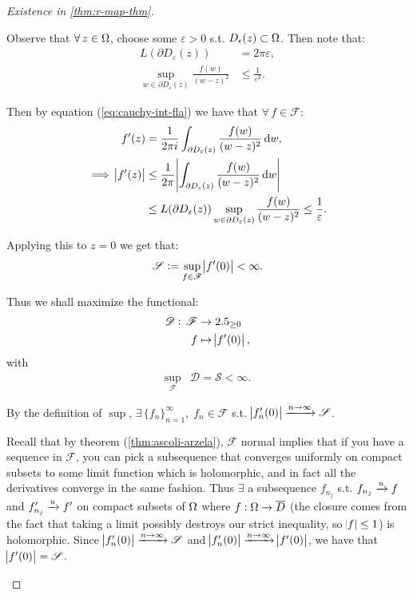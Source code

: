 \begin{proof}[Existence in \ref{thm:r-map-thm}]
\begin{enumerate}
Observe that $\forall \, z \in \Omega$, choose some $\varepsilon > 0$ s.t. $D_\epsilon(z) \subset \Omega$. Then note that:
\begin{align*}
    L(\partial D_\varepsilon (z)) &= 2 \pi \varepsilon,\\
    \sup_{w \in \partial D_\varepsilon (z)} \frac{f(w)}{(w-z)^2} &\leq \frac{1}{\varepsilon^2}.
\end{align*}

Then by equation (\ref{eq:cauchy-int-fla}) we have that $\forall \, f \in \mathscr{F}$:
\begin{align*}
    f'(z) &= \frac{1}{2 \pi i} \int_{\partial D_\varepsilon (z)} \frac{f(w)}{(w-z)^2} \dif w,\\
\implies \abs{f'(z)} &\leq \frac{1}{2 \pi} \abs{\int_{\partial D_\varepsilon (z)} \frac{f(w)}{(w-z)^2} \dif w}\\
&\leq L(\partial D_\varepsilon (z)) \sup_{w \in \partial D_\varepsilon (z)} \frac{f(w)}{(w-z)^2} \leq \frac{1}{\varepsilon}.
\end{align*}


Applying this to $z=0$ we get that:
\begin{align*}
    \mathscr{S} \vcentcolon = \sup_{f \in \mathscr{F}} \abs{f'(0)} < \infty.
\end{align*}

Thus we shall maximize the functional:
\begin{align*}
    \mathscr{D} : \, \mathscr{F} &\to 2.5_{\geq 0}\\
    f &\mapsto \abs{f'(0)},
\end{align*}
with
\begin{align*}
    \sup_{\mathscr{F}} & \mathscr{D} = \mathscr{S} < \infty.
\end{align*}

By the definition of $\sup$, $\exists \, \{ f_n\}_{n=1}^\infty, \; f_n \in \mathscr{F}$ s.t. $\abs{f_n' (0)} \xrightarrow[]{n \to \infty} \mathscr{S}$.

Recall that by theorem (\ref{thm:ascoli-arzela}), $\mathscr{F}$ normal implies that if you have a sequence in $\mathscr{F}$, you can pick a subsequence that converges uniformly on compact subsets to some limit function which is holomorphic, and in fact all the derivatives converge in the same fashion. Thus $\exists$ a subsequence $f_{n_j}$ s.t. $f_{n_j} \xrightarrow[]{u} f $ and $f_{n_j}' \xrightarrow[]{u} f' $ on compact subsets of $\Omega$ where $f: \Omega \to \overline{D}$ (the closure comes from the fact that taking a limit possibly destroys our strict inequality, so $\abs{f} \leq 1$) is holomorphic. Since $\abs{f_n' (0)} \xrightarrow[]{n \to \infty} \mathscr{S}$ and $\abs{f_n' (0)} \xrightarrow[]{n \to \infty} \abs{f'(0)}$, we have that $\abs{f'(0)} = \mathscr{S}$.


\end{enumerate}
\end{proof}
